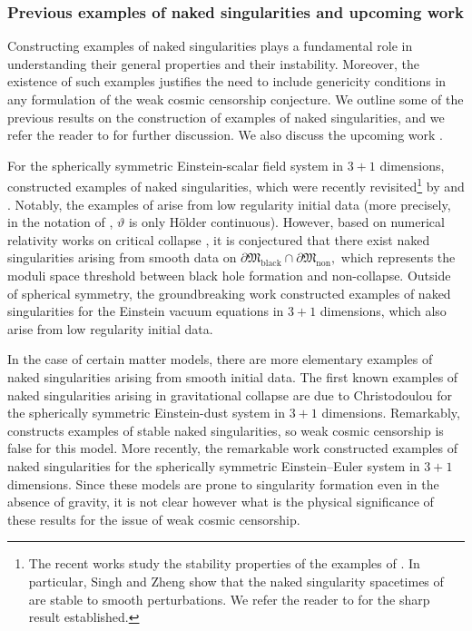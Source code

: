 \documentclass[11pt]{article}
\numberwithin{equation}{section}
\begin{document}
\subsubsection{Previous examples of naked singularities and upcoming work}\label{examples section}

Constructing examples of naked singularities plays a fundamental role in understanding their general properties and their instability. Moreover, the existence of such examples justifies the need to include genericity conditions in any formulation of the weak cosmic censorship conjecture. We outline some of the previous results on the construction of examples of naked singularities, and we refer the reader to \cite{Wccsurvey,CKdss} for further discussion. We also discuss the upcoming work \cite{preparation}.

For the spherically symmetric Einstein-scalar field system in $3+1$ dimensions, \cite{C94} constructed examples of naked singularities, which were recently revisited\footnote{The recent works \cite{Singh2,Zheng,Zheng2} study the stability properties of the examples of \cite{C94}. In particular, Singh and Zheng show that the naked singularity spacetimes of \cite{C94} are stable to smooth perturbations. We refer the reader to \cite{Zheng} for the sharp result established.} by \cite{Singh1} and \cite{Singh2,Zheng,Zheng2}. Notably, the examples of \cite{C94} arise from low regularity initial data (more precisely, in the notation of , $\vartheta$ is only Hölder continuous). However, based on numerical relativity works on critical collapse \cite{Cho93,Gundlach2007}, it is conjectured that there exist naked singularities arising from smooth data on $\partial\mathfrak{M}_{\mathrm{black}}\cap\partial\mathfrak{M}_{\mathrm{non}},$ which represents the moduli space threshold between black hole formation and non-collapse. Outside of spherical symmetry, the groundbreaking work \cite{RSR23,SR22} constructed examples of naked singularities for the Einstein vacuum equations in $3+1$ dimensions, which also arise from low regularity initial data. 

In the case of certain matter models, there are more elementary examples of naked singularities arising from smooth initial data. The first known examples of naked singularities arising in gravitational collapse are due to Christodoulou \cite{dust} for the spherically symmetric Einstein-dust system in $3+1$ dimensions. Remarkably, \cite{dust} constructs examples of stable naked singularities, so weak cosmic censorship is false for this model. More recently, the remarkable work \cite{euler} constructed examples of naked singularities for the spherically symmetric Einstein--Euler system in $3+1$ dimensions. Since these models are prone to singularity formation even in the absence of gravity, it is not clear however what is the physical significance of these results for the issue of weak cosmic censorship.
\end{document}
